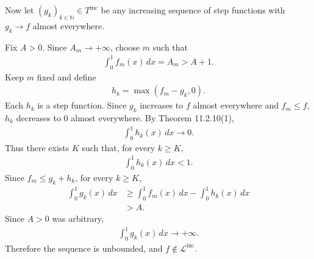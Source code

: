\documentclass[12pt,a4paper]{article}
\begin{document}
Now let $(g_k)_{k\in\mathbb{N}}\in T^{\mathrm{inc}}$
be any increasing sequence of step functions with
$g_k\to f$ almost everywhere.

Fix $A>0$. Since $A_m\to+\infty$, choose $m$ such that
\begin{align*}
\int_0^1 f_m(x)\,dx=A_m>A+1.
\end{align*}
Keep $m$ fixed and define
\begin{align*}
h_k=\max(f_m-g_k,0).
\end{align*}
Each $h_k$ is a step function. Since $g_k$ increases
to $f$ almost everywhere and $f_m\leq f$,
$h_k$ decreases to $0$ almost everywhere.
By Theorem 11.2.10(1),
\begin{align*}
\int_0^1 h_k(x)\,dx\longrightarrow 0.
\end{align*}
Thus there exists $K$ such that, for every $k\geq K$,
\begin{align*}
\int_0^1 h_k(x)\,dx<1.
\end{align*}
Since $f_m\leq g_k+h_k$, for every $k\geq K$,
\begin{align*}
\int_0^1 g_k(x)\,dx
&\geq \int_0^1 f_m(x)\,dx-\int_0^1 h_k(x)\,dx\\
&>A.
\end{align*}
Since $A>0$ was arbitrary,
\begin{align*}
\int_0^1 g_k(x)\,dx\longrightarrow+\infty.
\end{align*}
Therefore the sequence is unbounded, and
$f\notin\mathcal{L}^{\mathrm{inc}}$.
\end{document}
